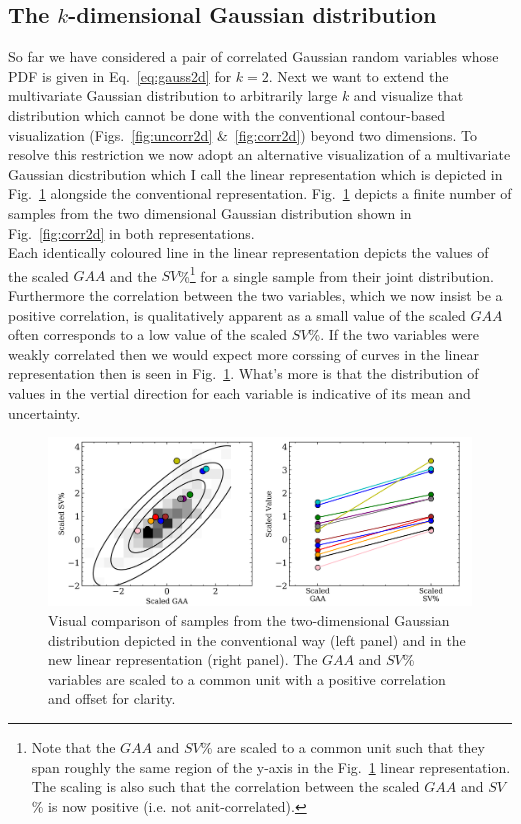 \subsection{The $k$-dimensional Gaussian distribution}
So far we have considered a pair of correlated Gaussian random variables whose
PDF is given in Eq.~\ref{eq:gauss2d} for $k=2$. Next we want to extend the multivariate
Gaussian distribution to arbitrarily large $k$ and visualize that distribution which
cannot be done with the conventional contour-based visualization
(Figs.~\ref{fig:uncorr2d} \&~\ref{fig:corr2d}) beyond two dimensions. To resolve this
restriction we now adopt an alternative visualization of a multivariate Gaussian
dicstribution which I call the linear representation which is depicted in
Fig.~\ref{fig:linrep} alongside the conventional representation. Fig.~\ref{fig:linrep}
depicts a finite number of samples from the two dimensional Gaussian distribution shown
in Fig.~\ref{fig:corr2d} in both representations. \\

Each identically coloured line in the
linear representation depicts the values of the scaled $GAA$ and the $SV$\%\footnote{Note
  that the $GAA$ and $SV$\% are scaled to a common unit such that they span roughly
  the same region of the y-axis in the Fig.~\ref{fig:linrep} linear representation.
  The scaling is also such that the correlation between the scaled $GAA$ and $SV$\% is
  now positive (i.e. not anit-correlated).} for a single
sample from their joint distribution. Furthermore the correlation between the two variables,
which we now insist be a positive correlation, is qualitatively apparent as a small value
of the scaled $GAA$ often corresponds to a low value of the scaled $SV$\%. If the two
variables were weakly correlated then we would expect more corssing of curves in the
linear representation then is seen in Fig.~\ref{fig:linrep}. What's more is that the
distribution of values in the vertial direction for each variable is indicative of its
mean and uncertainty. \\

\begin{figure}
  \centering
  \includegraphics[width=\hsize]{figures/linearrep_v1.png}
  \caption[Linear representation of Gaussian random varaibles in two dimensions.]
          {Visual comparison of samples from the two-dimensional Gaussian distribution
            depicted in the
            conventional way (left panel) and in the new linear representation (right
            panel). The $GAA$ and $SV$\% variables are scaled to a common unit with a
            positive correlation and offset for clarity.}
  \label{fig:linrep}
\end{figure}


